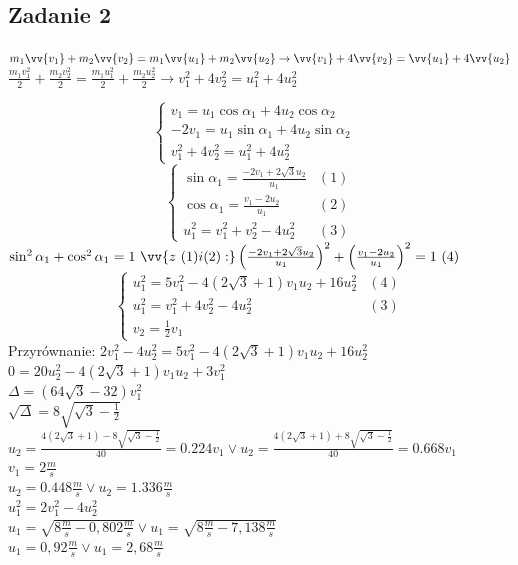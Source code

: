 \documentclass[14pt]{extarticle}
\begin{document}
    \subsection{Zadanie 2}
    \large
    $m_1\vv{v_1}+m_2\vv{v_2}=m_1\vv{u_1}+m_2\vv{u_2} \rightarrow \vv{v_1} + 4\vv{v_2} = \vv{u_1} + 4\vv{u_2}$\\
    $\frac{m_1v_1^2}{2}+\frac{m_2v_2^2}{2}=\frac{m_1u_1^2}{2}+\frac{m_2u_2^2}{2} \rightarrow v_1^2 + 4v_2^2 = u_1^2 + 4u_2^2 $
    
    \begin{equation*}
        \begin{cases}
            v_1 = u_1\cos\alpha _1 + 4u_2\cos\alpha _2 &\\
            -2v_1  = u_1\sin\alpha _1 + 4u_2\sin\alpha _2 &\\
            v_1^2 + 4v_2^2 = u_1^2 + 4u_2^2  &
        \end{cases}
    \end{equation*}
    \begin{equation*}
        \begin{cases}
            \sin\alpha _1 = \frac{-2v_1+2{\sqrt{3}}u_2}{u_1}&(1)\\
            \cos\alpha _1 = \frac{v_1-2u_2}{u_1}&(2)\\
            u_1^2 = v_1^2 + v_2^2 - 4u_2^2&(3)
        \end{cases}
    \end{equation*}
    $\sin^2\alpha _1 + \cos^2\alpha _1 = 1\ \vv{z \ (1)i(2):}
    \left(\frac{-2v_1+2{\sqrt{3}}u_2}{u_1}\right)^2 + \left(\frac{v_1-2u_2}{u_1}\right)^2 = 1 \ (4)$
    \begin{equation*}
        \begin{cases}
            u_1^2 = 5v_1^2-4\left(2{\sqrt{3}}+1\right)v_1u_2+16u_2^2&(4)\\
            u_1^2 = v_1^2 + 4v_2^2 - 4u_2^2&(3)\\
            v_2 = \frac{1}{2}v_1&
        \end{cases}
    \end{equation*}
        Przyrównanie: $2v_1^2 - 4u_2^2=5v_1^2-4\left(2{\sqrt{3}}+1\right)v_1u_2+16u_2^2$\\
        $ 0 = 20u_2^2-4\left(2{\sqrt{3}}+1\right)v_1u_2+3v_1^2 $\\

        $\Delta = \left(64\sqrt{{3}}-32\right)v_1^2 $\\
        $\sqrt{{\Delta}} = 8\sqrt{{\sqrt{3}-\frac{1}{2}}} $\\
        $u_2 = \frac{4\left(2\sqrt{3}+1\right)-8\sqrt{{\sqrt{3}-\frac{1}{2}}}}{40}=0.224v_1 \lor
        u_2 = \frac{4\left(2\sqrt{3}+1\right)+8\sqrt{{\sqrt{3}-\frac{1}{2}}}}{40}=0.668v_1$ \\
        $v_1=2 \frac{m}{s}$\\
        $u_2 = 0.448\frac{m}{s} \lor u_2 = 1.336\frac{m}{s}$\\
        $u_1^2=2v_1^2-4u_2^2$\\
        $u_1=\sqrt{8\frac{m}{s}-0,802\frac{m}{s}} \lor u_1=\sqrt{8\frac{m}{s}-7,138\frac{m}{s}} $\\
        $ u_1=0,92\frac{m}{s} \lor u_1=2,68\frac{m}{s} $\\
       
       
\end{document}
